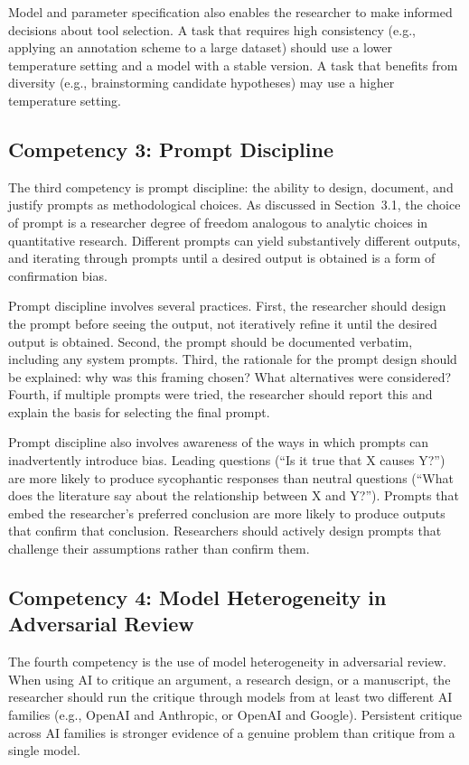 \documentclass[12pt, a4paper]{article}
\begin{document}
Model and parameter specification also enables the researcher to make informed decisions about tool selection. A task that requires high consistency (e.g., applying an annotation scheme to a large dataset) should use a lower temperature setting and a model with a stable version. A task that benefits from diversity (e.g., brainstorming candidate hypotheses) may use a higher temperature setting.

\subsection{Competency 3: Prompt Discipline}

The third competency is prompt discipline: the ability to design, document, and justify prompts as methodological choices. As discussed in Section~3.1, the choice of prompt is a researcher degree of freedom analogous to analytic choices in quantitative research. Different prompts can yield substantively different outputs, and iterating through prompts until a desired output is obtained is a form of confirmation bias.

Prompt discipline involves several practices. First, the researcher should design the prompt before seeing the output, not iteratively refine it until the desired output is obtained. Second, the prompt should be documented verbatim, including any system prompts. Third, the rationale for the prompt design should be explained: why was this framing chosen? What alternatives were considered? Fourth, if multiple prompts were tried, the researcher should report this and explain the basis for selecting the final prompt.

Prompt discipline also involves awareness of the ways in which prompts can inadvertently introduce bias. Leading questions (``Is it true that X causes Y?'') are more likely to produce sycophantic responses than neutral questions (``What does the literature say about the relationship between X and Y?''). Prompts that embed the researcher's preferred conclusion are more likely to produce outputs that confirm that conclusion. Researchers should actively design prompts that challenge their assumptions rather than confirm them.

\subsection{Competency 4: Model Heterogeneity in Adversarial Review}

The fourth competency is the use of model heterogeneity in adversarial review. When using AI to critique an argument, a research design, or a manuscript, the researcher should run the critique through models from at least two different AI families (e.g., OpenAI and Anthropic, or OpenAI and Google). Persistent critique across AI families is stronger evidence of a genuine problem than critique from a single model.
\end{document}
